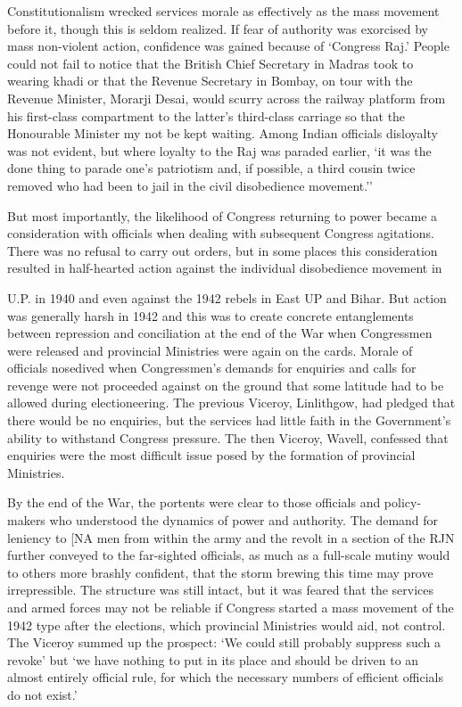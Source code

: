 Constitutionalism wrecked services morale as effectively as the mass movement before it, though this is seldom realized. If fear of authority was exorcised by mass non-violent action, confidence was gained because of `Congress Raj.' People could not fail to notice that the British Chief Secretary in Madras took to wearing khadi or that the Revenue Secretary in Bombay, on tour with the Revenue Minister, Morarji Desai, would scurry across the railway platform from his first-class compartment to the latter's third-class carriage so that the Honourable Minister my not be kept waiting. Among Indian officials disloyalty was not evident, but where loyalty to the Raj was paraded earlier, `it was the done thing to parade one's patriotism and, if possible, a third cousin twice removed who had been to jail in the civil disobedience movement.'' 

But most importantly, the likelihood of Congress returning to power became a consideration with officials when dealing with subsequent Congress agitations. There was no refusal to carry out orders, but in some places this consideration resulted in half-hearted action against the individual disobedience movement in 

U.P. in 1940 and even against the 1942 rebels in East UP and Bihar. But action was generally harsh in 1942 and this was to create concrete entanglements between repression and conciliation at the end of the War when Congressmen were released and provincial Ministries were again on the cards. Morale of officials nosedived when Congressmen's demands for enquiries and calls for revenge were not proceeded against on the ground that some latitude had to be allowed during electioneering. The previous Viceroy, Linlithgow, had pledged that there would be no enquiries, but the services had little faith in the Government's ability to withstand Congress pressure. The then Viceroy, Wavell, confessed that enquiries were the most difficult issue posed by the formation of provincial Ministries. 

By the end of the War, the portents were clear to those officials and policy-makers who understood the dynamics of power and authority. The demand for leniency to [NA men from within the army and the revolt in a section of the RJN further conveyed to the far-sighted officials, as much as a full-scale mutiny would to others more brashly confident, that the storm brewing this time may prove irrepressible. The structure was still intact, but it was feared that the services and armed forces may not be reliable if Congress started a mass movement of the 1942 type after the elections, which provincial Ministries would aid, not control. The Viceroy summed up the prospect: `We could still probably suppress such a revoke' but `we have nothing to put in its place and should be driven to an almost entirely official rule, for which the necessary numbers of efficient officials do not exist.' 

